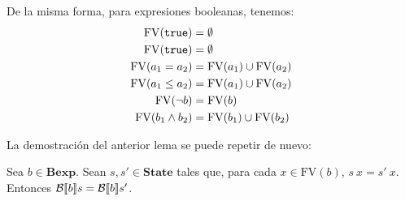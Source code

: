 De la misma forma, para expresiones booleanas, tenemos:
\begin{align*}
    \mathrm{FV}(\texttt{true}) & = \emptyset\\
    \mathrm{FV}(\texttt{true}) & = \emptyset\\
    \mathrm{FV}(a_1 = a_2) & = \mathrm{FV}(a_1) \cup \mathrm{FV}(a_2) \\
    \mathrm{FV}(a_1 \leq a_2) & = \mathrm{FV}(a_1) \cup \mathrm{FV}(a_2) \\
    \mathrm{FV}(\neg b) & = \mathrm{FV}(b)\\
    \mathrm{FV}(b_1 \land b_2) & = \mathrm{FV}(b_1) \cup \mathrm{FV}(b_2) 
\end{align*}

La demostración del anterior lema se puede repetir de nuevo:

\begin{lema}
Sea $b\in \mathbf{Bexp}$. Sean $s, s' \in \mathbf{State}$ tales que, para cada $x \in \mathrm{FV}(b)$, $s\ x = s'\ x$. Entonces $\mathcal{B}[\![b]\!]s = \mathcal{B}[\![b]\!]s'$.
\end{lema}
